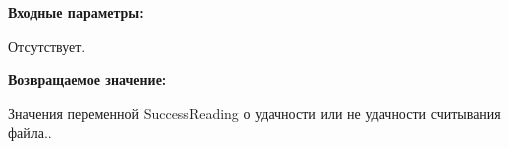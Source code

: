 \textbf{Входные параметры:}

Отсутствует.

\textbf{Возвращаемое значение:}

Значения переменной SuccessReading о удачности или не удачности считывания файла..